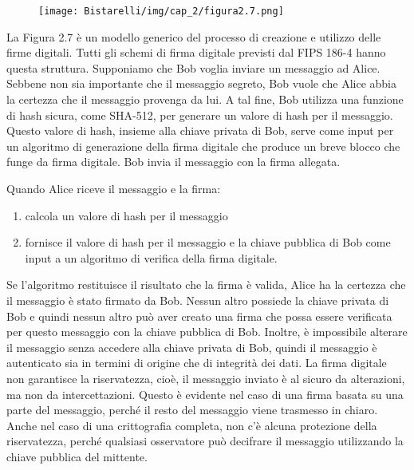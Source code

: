 \begin{figure}[H]
	\centering
    \texttt{[image: Bistarelli/img/cap\_2/figura2.7.png]}
\end{figure}


La Figura 2.7 è un modello generico del processo di creazione e utilizzo delle firme digitali. Tutti gli schemi di firma digitale previsti dal FIPS 186-4 hanno questa struttura. Supponiamo che Bob voglia inviare un messaggio ad Alice. Sebbene non sia importante che il messaggio segreto, Bob vuole che Alice abbia la certezza che il messaggio provenga da lui. A tal fine, Bob utilizza una funzione di hash sicura, come SHA-512, per generare un valore di hash per il messaggio. Questo valore di hash, insieme alla chiave privata di Bob, serve come input per un algoritmo di generazione della firma digitale che produce un breve blocco che funge da firma digitale. Bob invia il messaggio con la firma allegata.

\singlespacing

Quando Alice riceve il messaggio e la firma:

\begin{enumerate}
    \item calcola un valore di hash per il messaggio
    
    \item fornisce il valore di hash per il messaggio e la chiave pubblica di Bob come input a un algoritmo di verifica della firma digitale.
\end{enumerate}

Se l'algoritmo restituisce il risultato che la firma è valida, Alice ha la certezza che il messaggio è stato firmato da Bob. Nessun altro possiede la chiave privata di Bob e quindi nessun altro può aver creato una firma che possa essere verificata per questo messaggio con la chiave pubblica di Bob. Inoltre, è impossibile alterare il messaggio senza accedere alla chiave privata di Bob, quindi il messaggio è autenticato sia in termini di origine che di integrità dei dati. La firma digitale non garantisce la riservatezza, cioè, il messaggio inviato  è al sicuro da alterazioni, ma non da intercettazioni. Questo è evidente nel caso di una firma basata su una parte del messaggio, perché il resto del messaggio viene trasmesso in chiaro. Anche nel caso di una crittografia completa, non c'è alcuna protezione della riservatezza, perché qualsiasi osservatore può decifrare il messaggio utilizzando la chiave pubblica del mittente. 

